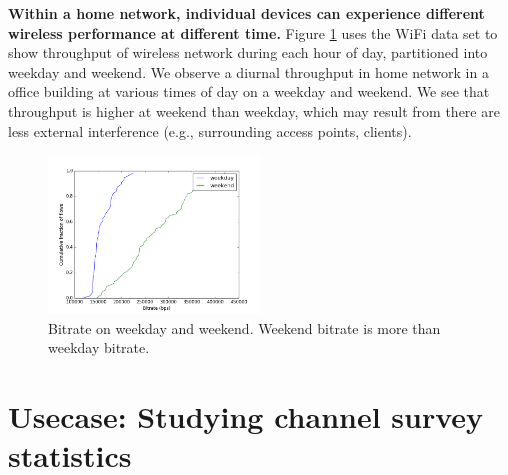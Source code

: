 \textbf{Within a home network, individual devices can experience different wireless performance at different time.} Figure \ref{fig:compare} uses the WiFi data set to show throughput of wireless network during each hour of day, partitioned into weekday and weekend. We observe a diurnal throughput in home network in a office building at various times of day on a weekday and weekend. We see that throughput is higher at weekend than weekday, which may result from there are less external interference (e.g., surrounding access points, clients).

\begin{figure}
\centering
\includegraphics[width=0.5\textwidth]{figure/bitrate(weekday_vs_weekend).png}
\caption{Bitrate on weekday and weekend. Weekend bitrate is more than weekday bitrate.} 
\label{fig:compare}
\end{figure}  

\section{Usecase: Studying channel survey statistics}
\label{sec.usecase2}

